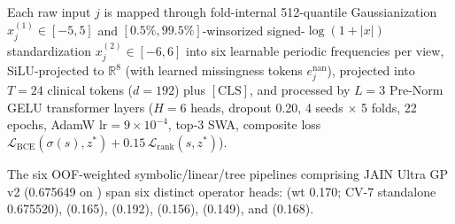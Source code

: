Each raw input $j$ is mapped through fold-internal 512-quantile Gaussianization $x_j^{(1)} \in [-5,5]$ and $[0.5\%,99.5\%]$-winsorized signed-$\log(1+|x|)$ standardization $x_j^{(2)} \in [-6,6]$ into six learnable periodic frequencies per view, SiLU-projected to $\mathbb{R}^8$ (with learned missingness tokens $e_j^{\mathrm{nan}}$), projected into $T=24$ clinical tokens ($d=192$) plus $[\mathrm{CLS}]$, and processed by $L=3$ Pre-Norm GELU transformer layers ($H=6$ heads, dropout 0.20, 4 seeds $\times$ 5 folds, 22 epochs, AdamW $\mathrm{lr}=9\times 10^{-4}$, top-3 SWA, composite loss $\mathcal{L}_{\mathrm{BCE}}(\sigma(s),z^*) + 0.15\,\mathcal{L}_{\mathrm{rank}}(s,z^*)$).

The six OOF-weighted symbolic/linear/tree pipelines comprising JAIN Ultra GP v2 (0.675649 on ) span six distinct operator heads:  (wt 0.170; CV-7 standalone 0.675520),  (0.165),  (0.192),  (0.156),  (0.149), and  (0.168).




